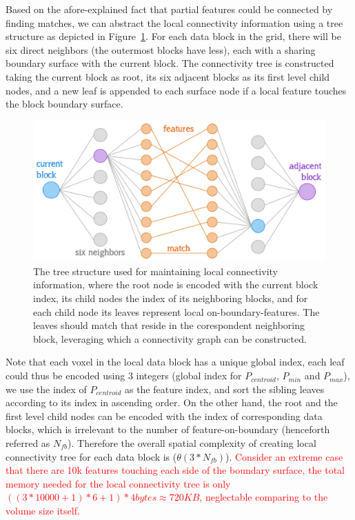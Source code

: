 \documentclass[10pt, conference, compsocconf]{IEEEtran}
\begin{document}
Based on the afore-explained fact that partial features could be connected by finding matches, we can abstract the local connectivity information using a tree structure as depicted in Figure~\ref{fig:match}. For each data block in the grid, there will be six direct neighbors (the outermost blocks have less), each with a sharing boundary surface with the current block. The connectivity tree is constructed taking the current block as root, its six adjacent blocks as its first level child nodes, and a new leaf is appended to each surface node if a local feature touches the block boundary surface. 

\begin{figure}[ht]
	\centering
	\includegraphics[width=1\linewidth]{match.png}
	\caption{The tree structure used for maintaining local connectivity information, where the root node is encoded with the current block index, its child nodes the index of its neighboring blocks, and for each child node its leaves represent local on-boundary-features. The leaves should match that reside in the corespondent neighboring block, leveraging which a connectivity graph can be constructed.}
	\label{fig:match}
\end{figure}

Note that each voxel in the local data block has a unique global index, each leaf could thus be encoded using 3 integers (global index for $P_{centroid}$, $P_{min}$ and $P_{max}$), we use the index of $P_{centroid}$ as the feature index, and sort the sibling leaves according to its index in ascending order. On the other hand, the root and the first level child nodes can be encoded with the index of corresponding data blocks, which is irrelevant to the number of feature-on-boundary (henceforth referred as $N_{fb}$). Therefore the overall spatial complexity of creating local connectivity tree for each data block is ($\theta(3*N_{fb})$). \textcolor{red}{Consider an extreme case that there are 10k features touching each side of the boundary surface, the total memory needed for the local connectivity tree is only $((3*10000 + 1)*6 + 1) * 4 bytes \approx 720KB$, neglectable comparing to the volume size itself.}
\end{document}
